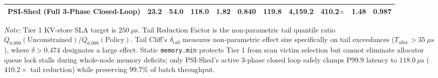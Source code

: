 \begin{table}[t]
\begin{adjustbox}{width=\textwidth}
\begin{tabular}{lrrrrrrrccc}
\textbf{PSI-Shed (Full 3-Phase Closed-Loop)} & 23.2 & 54.0 & \textbf{118.0} & 1.82 & 0.840 & 119.8 & 4,159.2 & \textbf{410.2$\times$} & \textbf{1.48} & \textbf{0.987} \\
\bottomrule
\end{tabular}
\end{adjustbox}
\begin{tablenotes}
\item \footnotesize{\textit{Note:} Tier 1 KV-store SLA target is $250\ \mu\text{s}$. Tail Reduction Factor is the non-parametric tail quantile ratio $Q_{0.999}(\text{Unconstrained}) / Q_{0.999}(\text{Policy})$. Tail Cliff's $\delta_{\text{tail}}$ measures non-parametric effect size specifically on tail exceedances ($T_{\text{alloc}} > 35\ \mu\text{s}$), where $\delta > 0.474$ designates a large effect. Static \texttt{memory.min} protects Tier 1 from scan victim selection but cannot eliminate allocator queue lock stalls during whole-node memory deficits; only PSI-Shed's active 3-phase closed loop safely clamps P99.9 latency to $118.0\ \mu\text{s}$ ($410.2\times$ tail reduction) while preserving $99.7\%$ of batch throughput.}
\end{tablenotes}
\end{table}
